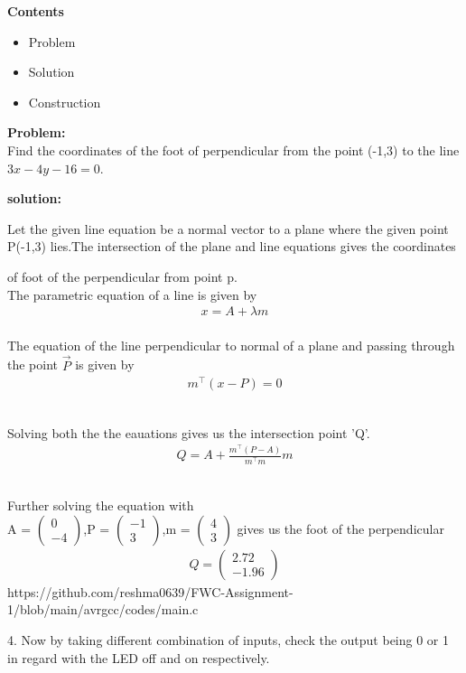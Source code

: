 \documentclass[12pt,a4paper]{report}
\begin{document}
\begin{multicols}{2}
 \raggedright \large \textbf{Contents}\normalsize \vspace{2mm}
\begin{itemize}
 \raggedright \item Problem \item Solution\item Construction
\end{itemize}
 \raggedright \large \textbf{Problem:} \normalsize \hspace{2mm}
\\  Find the coordinates of the foot of perpendicular from the point (-1,3) to the line $3x-4y-16=0$.\vspace{2mm}
\\ \raggedright\textbf{solution:} \vspace{2mm}
 \\ \raggedright Let the given line equation be a normal vector to a plane where the given point P(-1,3) lies.The intersection of the plane and line equations gives the coordinates \raggedright of foot of the perpendicular from point p.\vspace{2mm}
  \\The parametric equation of a line  is given by  
\begin{align}
	x = A + \lambda m
\end{align}
  \\The equation of the line perpendicular to normal of a plane 
		and passing through the point $\vec{P}$ is given by 
\begin{align}
	m^{\top}(x-P)  = 0
\end{align}
\\\raggedright Solving both the the eauations gives us the intersection point 'Q'.
\begin{align}   
       Q = A + \frac{ m^{\top}(P-A)}{m^{\top}m}m  
\end{align}      
\\ \raggedright Further solving the equation with  
\\A = $\begin{pmatrix} 0\\-4 \end{pmatrix}$,P = $\begin{pmatrix} -1\\3 \end{pmatrix}$,m = $\begin{pmatrix} 4\\3 \end{pmatrix}$ gives us the foot of the perpendicular
\begin{align}
	Q = \begin{pmatrix} 2.72\\-1.96 \end{pmatrix}
\end{align}
\centering https://github.com/reshma0639/FWC-Assignment-1/blob/main/avrgcc/codes/main.c \vspace{2mm}
\\ \raggedright 4. Now by taking different combination of inputs, check the output being 0 or 1 in regard with the LED off and on respectively. \vspace{2mm}

\end{multicols}
\end{document}
